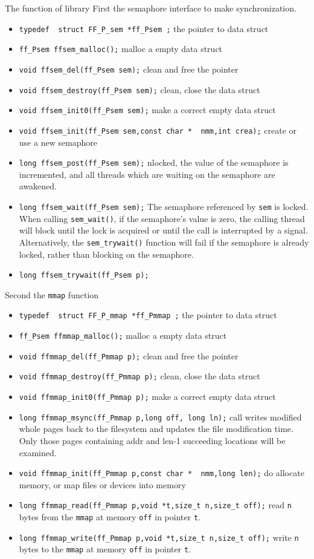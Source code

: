 \documentclass[a4paper,twoside,12pt]{book}
\begin{document}
The function of library  
First the semaphore interface to make synchronization. 
\begin{itemize}
\item\verb!typedef  struct FF_P_sem *ff_Psem ;! the pointer to data struct
\item\verb!ff_Psem ffsem_malloc();! malloc a empty data struct 
\item\verb!void ffsem_del(ff_Psem sem);! clean and free the pointer
\item\verb!void ffsem_destroy(ff_Psem sem);! clean, close the data struct
\item\verb!void ffsem_init0(ff_Psem sem);!  make a correct empty   data struct
\item\verb!void ffsem_init(ff_Psem sem,const char *  nmm,int crea);! create or use a new semaphore 
\item\verb!long ffsem_post(ff_Psem sem);! nlocked, the value of the semaphore is incremented, and all threads which are waiting on the semaphore are awakened.
\item\verb!long ffsem_wait(ff_Psem sem);! The semaphore referenced by \texttt{sem} is locked.  When calling \texttt{sem\_wait()}, if the semaphore's value is zero, the calling thread will block until the lock is acquired or until the call is interrupted by a signal.
     Alternatively, the \verb!sem_trywait()! function will fail if the semaphore is already locked, rather than blocking on the semaphore.
\item\verb!long ffsem_trywait(ff_Psem p);!

\end{itemize}
Second the \texttt{mmap} function
\begin{itemize}
\item\verb!typedef  struct FF_P_mmap *ff_Pmmap ;! the pointer to data struct
\item\verb!ff_Psem ffmmap_malloc();! malloc a empty data struct 
\item\verb!void ffmmap_del(ff_Pmmap p);! clean and free the pointer
\item\verb!void ffmmap_destroy(ff_Pmmap p);! clean, close the data struct
\item\verb!void ffmmap_init0(ff_Pmmap p);!  make a correct empty   data struct
\item\verb!long ffmmap_msync(ff_Pmmap p,long off, long ln);! call writes modified whole pages back to the filesystem and updates the file modification time.  Only those pages containing addr and len-1 succeeding locations will be examined.
\item\verb!void ffmmap_init(ff_Pmmap p,const char *  nmm,long len);!  do allocate memory, or map files or devices into memory
\item\verb!long ffmmap_read(ff_Pmmap p,void *t,size_t n,size_t off);! read \texttt{n} bytes from  the \texttt{mmap} at memory \texttt{off}
in pointer \texttt{t}.
\item\verb!long ffmmap_write(ff_Pmmap p,void *t,size_t n,size_t off);! write \texttt{n} bytes to  the \texttt{mmap} at memory \texttt{off}
in pointer \texttt{t}.

\end{itemize}
\end{document}
